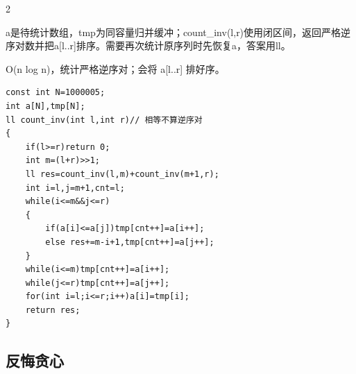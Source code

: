 \documentclass[UTF8,fontset=fandol,a4paper,twoside]{ctexart}
\newcommand{\note}[1]{{\fontsize{10}{12}\selectfont #1\par}}
\begin{document}
\begin{multicols}{2}
\note{a是待统计数组，tmp为同容量归并缓冲；count\_inv(\allowbreak{}l,\allowbreak{}r)\allowbreak{}使用闭区间，返回严格逆序对数并把a[\allowbreak{}l.\allowbreak{}.\allowbreak{}r]\allowbreak{}排序。需要再次统计原序列时先恢复a，答案用ll。}
\note{O(\allowbreak{}n log n)\allowbreak{}，统计严格逆序对；会将 a[\allowbreak{}l.\allowbreak{}.\allowbreak{}r]\allowbreak{} 排好序。}
\begin{lstlisting}
const int N=1000005;
int a[N],tmp[N];
ll count_inv(int l,int r)// 相等不算逆序对
{
    if(l>=r)return 0;
    int m=(l+r)>>1;
    ll res=count_inv(l,m)+count_inv(m+1,r);
    int i=l,j=m+1,cnt=l;
    while(i<=m&&j<=r)
    {
        if(a[i]<=a[j])tmp[cnt++]=a[i++];
        else res+=m-i+1,tmp[cnt++]=a[j++];
    }
    while(i<=m)tmp[cnt++]=a[i++];
    while(j<=r)tmp[cnt++]=a[j++];
    for(int i=l;i<=r;i++)a[i]=tmp[i];
    return res;
}
\end{lstlisting}
\subsection{反悔贪心}


\end{multicols}
\end{document}
